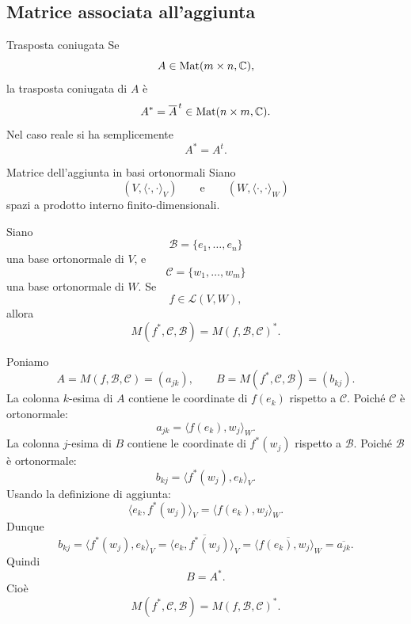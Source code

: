 \documentclass[a4paper]{article}
\begin{document}
\subsection{Matrice associata all'aggiunta}

\begin{snippetdefinition}{Trasposta coniugata}
    Se
    \[
        A\in\operatorname{Mat}(m\times n,\mathbb{C}),
    \]
    la trasposta coniugata di \(A\) è
    \[
        A^*=\overline{A}^{\,t}\in\operatorname{Mat}(n\times m,\mathbb{C}).
    \]
    Nel caso reale si ha semplicemente
    \[
        A^*=A^t.
    \]
\end{snippetdefinition}

\begin{snippetproposition}{Matrice dell'aggiunta in basi ortonormali}
    Siano
    \[
        (V,\langle\cdot,\cdot\rangle_V)
        \qquad
        \text{e}
        \qquad
        (W,\langle\cdot,\cdot\rangle_W)
    \]
    spazi a prodotto interno finito-dimensionali.

    Siano
    \[
        \mathcal{B}=\{e_1,\ldots,e_n\}
    \]
    una base ortonormale di \(V\), e
    \[
        \mathcal{C}=\{w_1,\ldots,w_m\}
    \]
    una base ortonormale di \(W\). Se
    \[
        f\in\mathcal{L}(V,W),
    \]
    allora
    \[
        M(f^*,\mathcal{C},\mathcal{B})
        =
        M(f,\mathcal{B},\mathcal{C})^*.
    \]
\end{snippetproposition}

\begin{snippetproof}{}
    Poniamo
    \[
        A=M(f,\mathcal{B},\mathcal{C})=(a_{jk}),
        \qquad
        B=M(f^*,\mathcal{C},\mathcal{B})=(b_{kj}).
    \]
    La colonna \(k\)-esima di \(A\) contiene le coordinate di \(f(e_k)\) rispetto a \(\mathcal{C}\). Poiché \(\mathcal{C}\) è ortonormale:
    \[
        a_{jk}=\langle f(e_k),w_j\rangle_W.
    \]
    La colonna \(j\)-esima di \(B\) contiene le coordinate di \(f^*(w_j)\) rispetto a \(\mathcal{B}\). Poiché \(\mathcal{B}\) è ortonormale:
    \[
        b_{kj}=\langle f^*(w_j),e_k\rangle_V.
    \]
    Usando la definizione di aggiunta:
    \[
        \langle e_k,f^*(w_j)\rangle_V
        =
        \langle f(e_k),w_j\rangle_W.
    \]
    Dunque
    \[
        b_{kj}
        =
        \langle f^*(w_j),e_k\rangle_V
        =
        \overline{\langle e_k,f^*(w_j)\rangle_V}
        =
        \overline{\langle f(e_k),w_j\rangle_W}
        =
        \overline{a_{jk}}.
    \]
    Quindi
    \[
        B=A^*.
    \]
    Cioè
    \[
        M(f^*,\mathcal{C},\mathcal{B})
        =
        M(f,\mathcal{B},\mathcal{C})^*.
    \]
\end{snippetproof}
\end{document}
